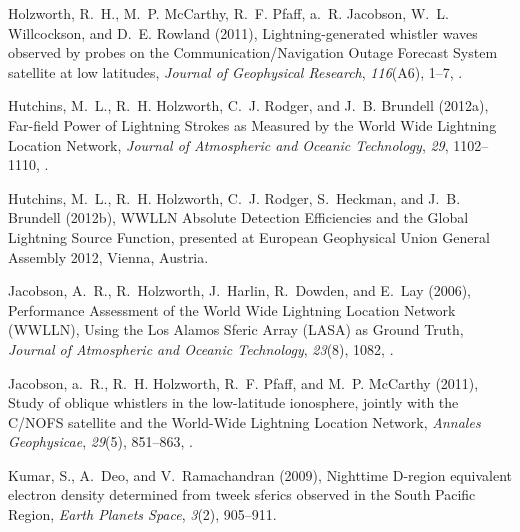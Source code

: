 \documentclass[draft,ras]{agutex}
\begin{document}
\begin{article}
\begin{thebibliography}{23}
Holzworth, R.~H., M.~P. McCarthy, R.~F. Pfaff, a.~R. Jacobson, W.~L.
  Willcockson, and D.~E. Rowland (2011), {Lightning-generated whistler waves
  observed by probes on the Communication/Navigation Outage Forecast System
  satellite at low latitudes}, \textit{Journal of Geophysical Research},
  \textit{116}(A6), 1--7, .

Hutchins, M.~L., R.~H. Holzworth, C.~J. Rodger, and J.~B. Brundell (2012a),
  {Far-field Power of Lightning Strokes as Measured by the World Wide Lightning
  Location Network}, \textit{Journal of Atmospheric and Oceanic Technology},
  \textit{29}, 1102--1110, .

Hutchins, M.~L., R.~H. Holzworth, C.~J. Rodger, S.~Heckman, and J.~B. Brundell (2012b),
  {WWLLN Absolute Detection Efficiencies and the Global Lightning Source
  Function}, presented at European Geophysical Union General Assembly 2012, Vienna, Austria.

Jacobson, A.~R., R.~Holzworth, J.~Harlin, R.~Dowden, and E.~Lay (2006),
  {Performance Assessment of the World Wide Lightning Location Network (WWLLN),
  Using the Los Alamos Sferic Array (LASA) as Ground Truth}, \textit{Journal of
  Atmospheric and Oceanic Technology}, \textit{23}(8), 1082,
  .

Jacobson, a.~R., R.~H. Holzworth, R.~F. Pfaff, and M.~P. McCarthy (2011),
  {Study of oblique whistlers in the low-latitude ionosphere, jointly with the
  C/NOFS satellite and the World-Wide Lightning Location Network},
  \textit{Annales Geophysicae}, \textit{29}(5), 851--863,
  .

Kumar, S., A.~Deo, and V.~Ramachandran (2009), {Nighttime D-region equivalent
  electron density determined from tweek sferics observed in the South Pacific
  Region}, \textit{Earth Planets Space}, \textit{3}(2), 905--911.


\end{thebibliography}
\end{article}
\end{document}
